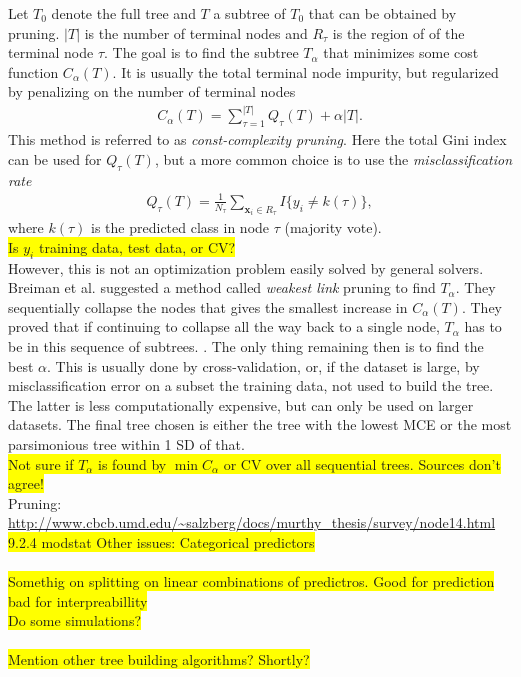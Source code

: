 Let $T_0$ denote the full tree and $T$ a subtree of $T_0$ that can be obtained by pruning. $|T|$ is the number of terminal nodes and $R_{\tau}$ is the region of of the terminal node $\tau$. The goal is to find the subtree $T_\alpha$ that minimizes some cost function $C_\alpha (T)$. It is usually the total terminal node impurity, but regularized by penalizing on the number of terminal nodes
\begin{align}
  C_\alpha (T) = \sum_{\tau = 1}^{|T|} Q_\tau (T) + \alpha |T|. 
\end{align}
This method is referred to as \textit{const-complexity pruning}.
Here the total Gini index can be used for $Q_\tau (T)$, but a more common choice is to use the \textit{misclassification rate} 
\begin{align}
  Q_\tau (T) =  \frac{1}{N_{\tau}} \sum_{\mathbf{x}_i \in R_{\tau}} I\{y_i \neq k(\tau)\},
\end{align}
where $k(\tau)$ is the predicted class in node $\tau$ (majority vote).
\\ \colorbox{yellow}{Is $y_i$ training data, test data, or CV?} \\
However, this is not an optimization problem easily solved by general solvers. Breiman et al. \cite{breiman} suggested a method called \textit{weakest link} pruning to find $T_\alpha$. They sequentially collapse the nodes that gives the smallest increase in $C_\alpha(T)$.
They proved that if continuing to collapse all the way back to a single node, $T_\alpha$ has to be in this sequence of subtrees.  . The only thing remaining then is to find the best $\alpha$. This is usually done by cross-validation, or, if the dataset is large, by misclassification error on a subset the training data, not used to build the tree. The latter is less computationally expensive, but can only be used on larger datasets. The final tree chosen is either the tree with the lowest MCE or the most parsimonious tree within 1 SD of that.
\\ \colorbox{yellow}{Not sure if $T_\alpha$ is found by $\min C_\alpha$ or CV over all sequential trees. Sources don't agree!}
\\ Pruning: \url{http://www.cbcb.umd.edu/~salzberg/docs/murthy_thesis/survey/node14.html}\\
\colorbox{yellow}{9.2.4 modstat Other issues: Categorical predictors} \\ \\
%
\colorbox{yellow}{Somethig on splitting on linear combinations of predictros. Good for prediction bad for interpreabillity}\\
\colorbox{yellow}{Do some simulations?}\\
\\\colorbox{yellow}{Mention other tree building algorithms? Shortly?}


